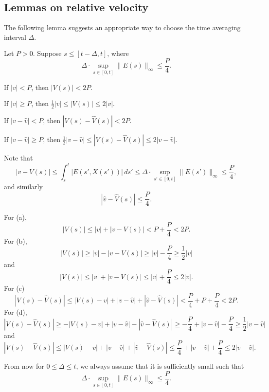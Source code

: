 \documentclass{article}
\begin{document}
\subsection{Lemmas on relative velocity}
The following lemma suggests an appropriate way to choose the time averaging interval $\Delta$.
\begin{lem}
Let $P>0$.
Suppose $s\le[t-\Delta,t]$, where
\[\Delta\cdot\sup_{s\in[0,t]}\|E(s)\|_\infty\le\frac P4.\]
\begin{parts}
\item If $|v|<P$, then $|V(s)|<2P$.
\item If $|v|\ge P$, then $\frac12|v|\le|V(s)|\le2|v|$. 
\item If $|v-\hat v|<P$, then $|V(s)-\hat V(s)|<2P$.
\item If $|v-\hat v|\ge P$, then $\frac12|v-\hat v|\le|V(s)-\hat V(s)|\le2|v-\hat v|$.
\end{parts}
\end{lem}
\begin{pf}
Note that
\[|v-V(s)|\le\int_s^t|E(s',X(s'))|\,ds'\le\Delta\cdot\sup_{s'\in[0,t]}\|E(s')\|_\infty\le\frac P4,\]
and similarly
\[|\hat v-\hat V(s)|\le\frac P4.\]

For (a),
\[|V(s)|\le|v|+|v-V(s)|<P+\frac P4<2P.\]
For (b),
\[|V(s)|\ge|v|-|v-V(s)|\ge|v|-\frac P4\ge\frac12|v|\]
and
\[|V(s)|\le|v|+|v-V(s)|\le|v|+\frac P4\le2|v|.\]
For (c)
\[|V(s)-\hat V(s)|\le|V(s)-v|+|v-\hat v|+|\hat v-\hat V(s)|<\frac P4+P+\frac P4<2P.\]
For (d),
\[|V(s)-\hat V(s)|\ge-|V(s)-v|+|v-\hat v|-|\hat v-\hat V(s)|\ge-\frac P4+|v-\hat v|-\frac P4\ge\frac12|v-\hat v|\]
and
\[|V(s)-\hat V(s)|\le|V(s)-v|+|v-\hat v|+|\hat v-\hat V(s)|\le\frac P4+|v-\hat v|+\frac P4\le2|v-\hat v|.\]
\end{pf}


From now for $0\le\Delta\le t$, we always assume that it is sufficiently small such that
\[\Delta\cdot\sup_{s\in[0,t]}\|E(s)\|_\infty\le\frac P4.\]
\end{document}
